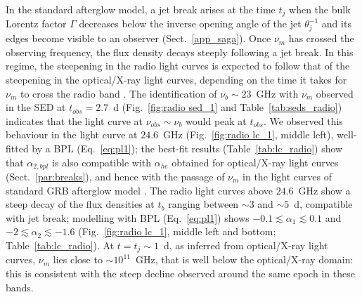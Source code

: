 \documentclass{aa}
\begin{document}
In the standard afterglow model, a jet break arises at the time $t_{j}$ when the bulk Lorentz factor $\Gamma$ decreases below the inverse opening angle of the jet $\theta_j^{-1}$ and its edges become visible to an observer (Sect.~\ref{app_saga}).
Once $\nu_m$ has crossed the observing frequency, the flux density decays steeply following a jet break.
In this regime, the steepening in the radio light curves is expected to follow that of the steepening in the optical/X-ray light curves, depending on the time it takes for $\nu_m$ to cross the radio band \citep{Laskar15}.
The identification of $\nu_b \sim 23$~GHz with $\nu_m$ observed in the SED at $t_{obs} = 2.7$~d (Fig.~\ref{fig:radio sed_1} and Table~\ref{tab:seds_radio}) indicates that the light curve at $\nu_{obs} \sim \nu_b$ would peak at $t_{obs}$.
We observed this behaviour in the light curve at $24.6$~GHz (Fig.~\ref{fig:radio lc_1}, middle left), well-fitted by a BPL (Eq.~\ref{eq:pl1}); the best-fit results (Table~\ref{tab:lc_radio}) show that $\alpha_{2,bpl}$ is also compatible with $\alpha_{he}$ obtained for optical/X-ray light curves (Sect.~\ref{par:breaks}), and hence with the passage of $\nu_m$ in the light curves of standard GRB afterglow model \citep{Sari98}.
The radio light curves above $24.6$~GHz show a steep decay of the flux densities at $t_b$ ranging between $\sim 3$ and $\sim 5$~d, compatible with jet break; modelling with BPL (Eq.~\ref{eq:pl1}) shows $-0.1 \lesssim \alpha_1 \lesssim 0.1$ and $-2 \lesssim \alpha_2 \lesssim -1.6$ (Fig.~\ref{fig:radio lc_1}, middle left and bottom; Table~\ref{tab:lc_radio}).
At $t = t_j \sim 1$~d, as inferred from optical/X-ray light curves, $\nu_m$ lies close to $\sim 10^{11}$~GHz, that is well below the optical/X-ray domain: this is consistent with the steep decline observed around the same epoch in these bands.
\end{document}
